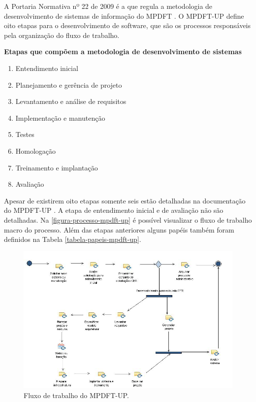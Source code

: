 \documentclass[
	article,			%
	11pt,				%
	oneside,			%
	a4paper,			%
	english,			%
	brazil,				%
	sumario=tradicional
	]{abntex2}
\begin{document}
A Portaria Normativa nº 22 de 2009 é a que regula a metodologia de
desenvolvimento de sistemas de informação do MPDFT \cite{portaria-22-2009}. O
MPDFT-UP define oito etapas para o desenvolvimento de software, que são os
processos responsáveis pela organização do fluxo de trabalho.

\textbf{Etapas que compõem a metodologia de desenvolvimento de sistemas}

\begin{enumerate}
   \item Entendimento inicial
   \item Planejamento e gerência de projeto
   \item Levantamento e análise de requisitos
   \item Implementação e manutenção
   \item Testes
   \item Homologação
   \item Treinamento e implantação
   \item Avaliação
\end{enumerate}

Apesar de existirem oito etapas somente seis estão detalhadas na documentação do
MPDFT-UP \cite{mpdft-up}. A etapa de entendimento inicial e de avaliação não são
detalhadas. Na \autoref{figura-processo-mpdft-up} é possível visualizar o fluxo
de trabalho macro do processo. Além das etapas anteriores alguns papéis também
foram definidos na Tabela \autoref{tabela-papeis-mpdft-up}.

\begin{figure}[htb]
   \caption{Fluxo de trabalho do MPDFT-UP.}
   \label{figura-processo-mpdft-up}
   \begin{center}
       \includegraphics[scale=0.45]{MPDFT-UP_BFB966A8_bfb966a8_Activity.jpeg}
   \end{center}
\end{figure}
\end{document}
